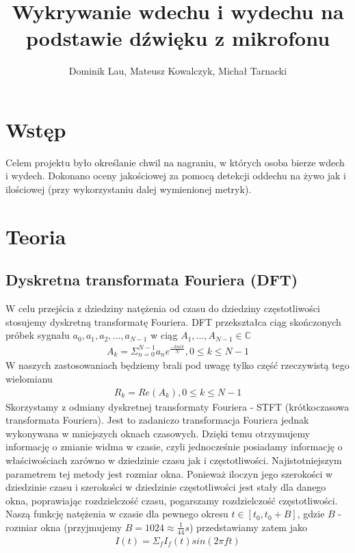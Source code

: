 \documentclass[polish]{article}
\title{Wykrywanie wdechu i wydechu na podstawie dźwięku z mikrofonu}
\author{Dominik Lau, Mateusz Kowalczyk, Michał Tarnacki}
\begin{document}
\maketitle
\tableofcontents

\section{Wstęp}
Celem projektu było określanie chwil na nagraniu, w których osoba bierze wdech i wydech. 
Dokonano oceny jakościowej za pomocą detekcji oddechu na żywo jak i ilościowej (przy wykorzystaniu
dalej wymienionej metryk).

\section{Teoria}
\subsection{Dyskretna transformata Fouriera (DFT)}
W celu przejścia z dziedziny natężenia od czasu do dziedziny częstotliwości stosujemy dyskretną transformatę
Fouriera.  DFT przekształca ciąg skończonych próbek sygnału $a_0, a_1, a_2, ..., a_{N-1}$ w ciąg 
$A_1, ..., A_{N-1} \in \mathbb{C}$
\begin{gather*}
	A_k = \Sigma_{n=0}^{N-1} a_ne^{\frac{-kni\pi}{N}}, 0 \le k \le N-1
\end{gather*}
W naszych zastosowaniach będziemy brali pod uwagę tylko część rzeczywistą tego wielomianu
\begin{gather*}
	R_k = Re(A_k), 0 \le k \le N-1
\end{gather*}
Skorzystamy z odmiany dyskretnej transformaty Fouriera - STFT (krótkoczasowa transformata Fouriera). 
Jest to zadaniczo transformacja Fouriera jednak wykonywana w mniejszych oknach czasowych. Dzięki temu otrzymujemy informację o zmianie widma w czasie, czyli jednocześnie posiadamy informację o właściwościach zarówno w dziedzinie czasu jak i częstotliwości. Najistotniejszym parametrem tej metody jest rozmiar okna. Ponieważ iloczyn jego szerokości w dziedzinie czasu i szerokości w dziedzinie częstotliwości jest stały dla danego okna, poprawiając rozdzielczość czasu, pogarszamy rozdzielczość częstotliwości.
Naszą funkcję natężenia w czasie dla pewnego okresu $t \in [t_0, t_0 + B]$, gdzie $B$ - rozmiar okna (przyjmujemy $B=1024\approx \frac{1}{44} s$) przedstawiamy zatem jako 
\begin{gather*}
	I(t) = \Sigma_{f} I_{f}(t)sin(2 \pi f t)
\end{gather*}
\end{document}
